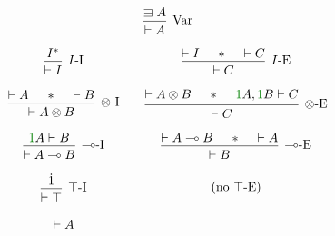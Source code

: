 \begin{figure}
  \begin{displaymath}
    \begin{prooftree}
      \hypo{\sqni A}
      \infer1[Var]{\vdash A}
    \end{prooftree}
  \end{displaymath}

  \begin{displaymath}
    \begin{matrix}
      \begin{prooftree}
        \hypo{I^*}
        \infer1[$I$-I]{\vdash I}
      \end{prooftree}
      &&
      \begin{prooftree}
        \hypo{\vdash I}
        \hypo{\sep}
        \hypo{\vdash C}
        \infer3[$I$-E]{\vdash C}
      \end{prooftree}
      \\\\
      \begin{prooftree}
        \hypo{\vdash A}
        \hypo{\sep}
        \hypo{\vdash B}
        \infer3[$\otimes$-I]{\vdash A \otimes B}
      \end{prooftree}
      &&
      \begin{prooftree}
        \hypo{\vdash A \otimes B}
        \hypo{\sep}
        \hypo{\gr1A, \gr1B \vdash C}
        \infer3[$\otimes$-E]{\vdash C}
      \end{prooftree}
      \\\\
      \begin{prooftree}
        \hypo{\gr1A \vdash B}
        \infer1[$\multimap$-I]{\vdash A \multimap B}
      \end{prooftree}
      &&
      \begin{prooftree}
        \hypo{\vdash A \multimap B}
        \hypo{\sep}
        \hypo{\vdash A}
        \infer3[$\multimap$-E]{\vdash B}
      \end{prooftree}
      \\\\
      \begin{prooftree}
        \hypo{\dot1}
        \infer1[$\top$-I]{\vdash \top}
      \end{prooftree}
      &&
      \textrm{(no $\top$-E)}
      \\\\
      \begin{prooftree}
        \hypo{\vdash A}

\end{prooftree}
\end{matrix}
\end{displaymath}
\end{figure}
